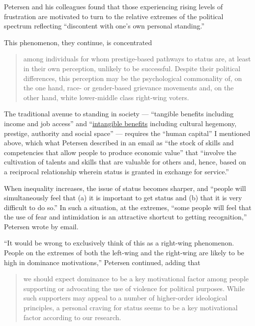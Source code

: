 Petersen and his colleagues found that those experiencing rising levels
of frustration are motivated to turn to the relative extremes of the
political spectrum reflecting ``discontent with one's own personal
standing.''

This phenomenon, they continue, is concentrated

\begin{quote}
among individuals for whom prestige-based pathways to status are, at
least in their own perception, unlikely to be successful. Despite their
political differences, this perception may be the psychological
commonality of, on the one hand, race- or gender-based grievance
movements and, on the other hand, white lower-middle class right-wing
voters.
\end{quote}

The traditional avenue to standing in society --- ``tangible benefits
including income and job access'' and
``\href{https://books.google.com/books?id=GL80BQR6pk0C\&q=taggible\#v=snippet\&q=intangible\&f=false}{intangible
benefits} including cultural hegemony, prestige, authority and social
space'' --- requires the ``human capital'' I mentioned above, which what
Petersen described in an email as ``the stock of skills and competencies
that allow people to produce economic value'' that ``involve the
cultivation of talents and skills that are valuable for others and,
hence, based on a reciprocal relationship wherein status is granted in
exchange for service.''

When inequality increases, the issue of status becomes sharper, and
``people will simultaneously feel that (a) it is important to get status
and (b) that it is very difficult to do so.'' In such a situation, at
the extremes, ``some people will feel that the use of fear and
intimidation is an attractive shortcut to getting recognition,''
Petersen wrote by email.

``It would be wrong to exclusively think of this as a right-wing
phenomenon. People on the extremes of both the left-wing and the
right-wing are likely to be high in dominance motivations,'' Petersen
continued, adding that

\begin{quote}
we should expect dominance to be a key motivational factor among people
supporting or advocating the use of violence for political purposes.
While such supporters may appeal to a number of higher-order ideological
principles, a personal craving for status seems to be a key motivational
factor according to our research.
\end{quote}

